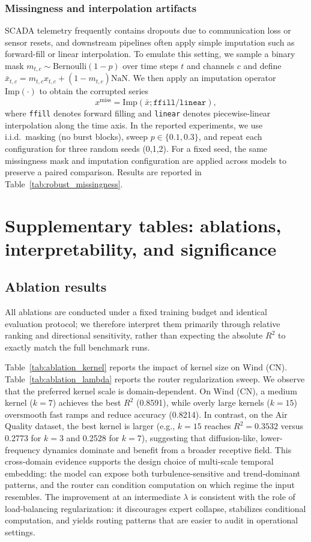 \documentclass[review,3p,times]{elsarticle}
\begin{document}
\subsubsection{Missingness and interpolation artifacts}
SCADA telemetry frequently contains dropouts due to communication loss or sensor resets, and downstream pipelines often apply simple imputation such as forward-fill or linear interpolation. To emulate this setting, we sample a binary mask $m_{t,c}\sim\mathrm{Bernoulli}(1-p)$ over time steps $t$ and channels $c$ and define $\bar{x}_{t,c}=m_{t,c}x_{t,c}+(1-m_{t,c})\mathrm{NaN}$. We then apply an imputation operator $\mathrm{Imp}(\cdot)$ to obtain the corrupted series
\begin{equation}
x^{\text{miss}}=\mathrm{Imp}(\bar{x};\texttt{ffill/linear}),
\end{equation}
where \texttt{ffill} denotes forward filling and \texttt{linear} denotes piecewise-linear interpolation along the time axis. In the reported experiments, we use i.i.d.\ masking (no burst blocks), sweep $p\in\{0.1,0.3\}$, and repeat each configuration for three random seeds (0,1,2). For a fixed seed, the same missingness mask and imputation configuration are applied across models to preserve a paired comparison. Results are reported in Table~\ref{tab:robust_missingness}.
\section{Supplementary tables: ablations, interpretability, and significance}\label{app:supp_tables}

\subsection{Ablation results}
\label{subsec:results_ablation}
All ablations are conducted under a fixed training budget and identical evaluation protocol; we therefore interpret them primarily through relative ranking and directional sensitivity, rather than expecting the absolute $R^2$ to exactly match the full benchmark runs.

Table~\ref{tab:ablation_kernel} reports the impact of kernel size on Wind (CN). Table~\ref{tab:ablation_lambda} reports the router regularization sweep. We observe that the preferred kernel scale is domain-dependent. On Wind (CN), a medium kernel ($k=7$) achieves the best $R^2$ (0.8591), while overly large kernels ($k=15$) oversmooth fast ramps and reduce accuracy (0.8214). In contrast, on the Air Quality dataset, the best kernel is larger (e.g., $k=15$ reaches $R^2=0.3532$ versus 0.2773 for $k=3$ and 0.2528 for $k=7$), suggesting that diffusion-like, lower-frequency dynamics dominate and benefit from a broader receptive field. This cross-domain evidence supports the design choice of multi-scale temporal embedding: the model can expose both turbulence-sensitive and trend-dominant patterns, and the router can condition computation on which regime the input resembles. The improvement at an intermediate $\lambda$ is consistent with the role of load-balancing regularization: it discourages expert collapse, stabilizes conditional computation, and yields routing patterns that are easier to audit in operational settings.
\end{document}
